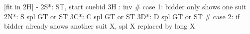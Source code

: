 [fit in 2H] - 
2S*: ST, start cuebid
3H : inv
# case 1: bidder only shows one suit
2N*: S spl GT or ST
3C*: C spl GT or ST
3D*: D spl GT or ST
# case 2: if bidder already shows another suit X, spl X replaced by long X
